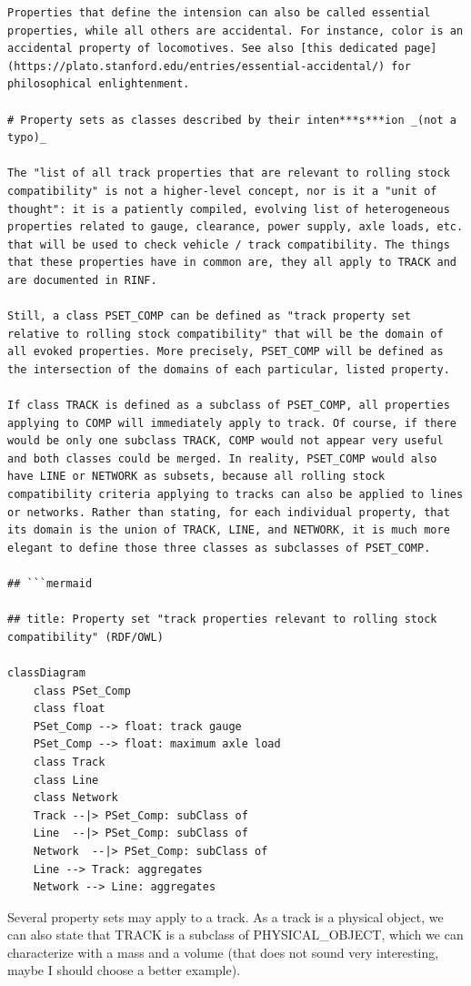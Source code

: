 \documentclass[
  11pt,
]{article}
\begin{document}
\begin{verbatim}
Properties that define the intension can also be called essential properties, while all others are accidental. For instance, color is an accidental property of locomotives. See also [this dedicated page](https://plato.stanford.edu/entries/essential-accidental/) for philosophical enlightenment.

# Property sets as classes described by their inten***s***ion _(not a typo)_

The "list of all track properties that are relevant to rolling stock compatibility" is not a higher-level concept, nor is it a "unit of thought": it is a patiently compiled, evolving list of heterogeneous properties related to gauge, clearance, power supply, axle loads, etc. that will be used to check vehicle / track compatibility. The things that these properties have in common are, they all apply to TRACK and are documented in RINF.

Still, a class PSET_COMP can be defined as "track property set relative to rolling stock compatibility" that will be the domain of all evoked properties. More precisely, PSET_COMP will be defined as the intersection of the domains of each particular, listed property.

If class TRACK is defined as a subclass of PSET_COMP, all properties applying to COMP will immediately apply to track. Of course, if there would be only one subclass TRACK, COMP would not appear very useful and both classes could be merged. In reality, PSET_COMP would also have LINE or NETWORK as subsets, because all rolling stock compatibility criteria applying to tracks can also be applied to lines or networks. Rather than stating, for each individual property, that its domain is the union of TRACK, LINE, and NETWORK, it is much more elegant to define those three classes as subclasses of PSET_COMP.

## ```mermaid

## title: Property set "track properties relevant to rolling stock compatibility" (RDF/OWL)

classDiagram
    class PSet_Comp
    class float
    PSet_Comp --> float: track gauge
    PSet_Comp --> float: maximum axle load
    class Track
    class Line
    class Network
    Track --|> PSet_Comp: subClass of
    Line  --|> PSet_Comp: subClass of
    Network  --|> PSet_Comp: subClass of
    Line --> Track: aggregates
    Network --> Line: aggregates
\end{verbatim}

Several property sets may apply to a track. As a track is a physical
object, we can also state that TRACK is a subclass of PHYSICAL\_OBJECT,
which we can characterize with a mass and a volume (that does not sound
very interesting, maybe I should choose a better example).
\end{document}
